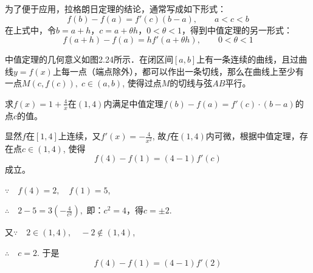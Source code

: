 为了便于应用，拉格朗日定理的结论，通常写成如下形式：
\begin{equation}
   f (b) -f (a) =f' (c) (b-a),\qquad a<c<b 
\end{equation}
在上式中，令$b=a+h$，$c=a+\theta h$，$0<\theta<1$，得到中值定理的另一形式：
\begin{equation}
    f (a+h) -f (a) =hf' (a+\theta h) ,\qquad 0<\theta<1
\end{equation}

中值定理的几何意义如图2.24所示．在闭区间$[a,b]$上有一条连续的曲线，且过曲线$y=f(x)$上每一点（端点除外），都可以作出一条切线，那么在曲线上至少有一点$M(c, f( c)),\; c\in (a,b)$, 使得过点$M$的切线与弦$AB$平行。

\begin{figure}[htp]
    \centering
{}
    \caption{}
\end{figure}



\begin{example}
求$f(x)=1+\frac{4}{x}$在$(1, 4)$内满足中值定理$f(b)-f(a)=f'(c)\cdot (b-a)$的点$c$的值。
\end{example}


\begin{solution}
    显然$f$在$[1, 4]$上连续，又$f'(x)=-\frac{4}{x^2}$, 故$f$在$(1, 4)$内可微，根据中值定理，存在点$c\in (1, 4)$, 使得
\[    f (4) -f (1) = (4-1) f' (c)\]
成立。

$\because\quad f (4) =2,\quad f (1) =5$,

$\therefore\quad 2-5=3 \left(-\frac{4}{c^2}\right),$
即：$c^2=4$，得$c=\pm 2$.

又$\because\quad 2\in (1, 4),\quad -2\notin (1, 4)$,

$\therefore\quad c=2$. 于是
\[    f (4) -f (1) = (4-1) f' (2) \]
\end{solution}

